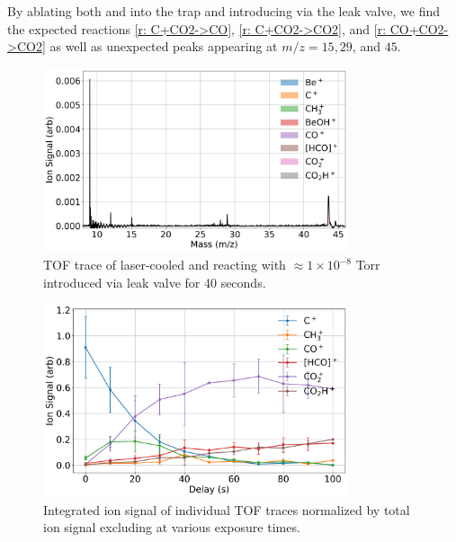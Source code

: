 
\subsubsection{}
By ablating both  and  into the trap and introducing  via the leak valve, we find the expected reactions \ref{r: C+CO2->CO}, \ref{r: C+CO2->CO2}, and \ref{r: CO+CO2->CO2} as well as unexpected peaks appearing at $m/z=15, 29$, and $45$.

\begin{figure}
	\label{fig: C+CO2 TOF}
	\centering
	\includegraphics[width=0.8\textwidth]{images/C_CO2_TOF.png}
	\caption{TOF trace of laser-cooled  and  reacting with $\approx 1 \times 10^{-8}$ Torr  introduced via leak valve for 40 seconds.}
\end{figure}

\begin{figure}
	\label{fig: C+CO2 traces}
	\centering
	\includegraphics[width=0.8\textwidth]{images/C_CO2_traces.png}
	\caption{Integrated ion signal of individual TOF traces normalized by total ion signal excluding  at various  exposure times.}
\end{figure}

